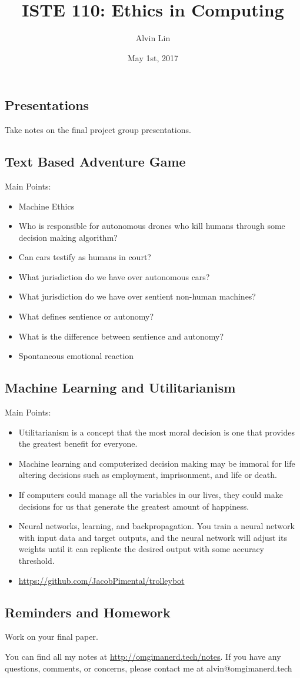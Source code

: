 \documentclass{article}
\title{ISTE 110: Ethics in Computing}
\author{Alvin Lin}
\date{May 1st, 2017}
\begin{document}
\maketitle

\subsection*{Presentations}
Take notes on the final project group presentations.

\subsection*{Text Based Adventure Game}
Main Points:
\begin{itemize}
  \item Machine Ethics
  \item Who is responsible for autonomous drones who kill humans through some
    decision making algorithm?
  \item Can cars testify as humans in court?
  \item What jurisdiction do we have over autonomous cars?
  \item What jurisdiction do we have over sentient non-human machines?
  \item What defines sentience or autonomy?
  \item What is the difference between sentience and autonomy?
  \item Spontaneous emotional reaction
\end{itemize}

\subsection*{Machine Learning and Utilitarianism}
Main Points:
\begin{itemize}
  \item Utilitarianism is a concept that the most moral decision is one that
    provides the greatest benefit for everyone.
  \item Machine learning and computerized decision making may be immoral for
    life altering decisions such as employment, imprisonment, and life or death.
  \item If computers could manage all the variables in our lives, they could
    make decisions for us that generate the greatest amount of happiness.
  \item Neural networks, learning, and backpropagation. You train a neural
    network with input data and target outputs, and the neural network will
    adjust its weights until it can replicate the desired output with some
    accuracy threshold.
  \item \url{https://github.com/JacobPimental/trolleybot}
\end{itemize}

\subsection*{Reminders and Homework}
Work on your final paper.

\begin{center}
  You can find all my notes at \url{http://omgimanerd.tech/notes}. If you have
  any questions, comments, or concerns, please contact me at
  alvin@omgimanerd.tech
\end{center}
\end{document}
